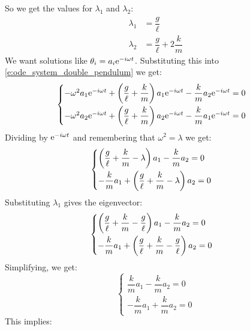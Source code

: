 So we get the values for $\lambda_1$ and $\lambda_2$:
\begin{equation}
    \begin{split}
        \lambda_1 &= \dfrac{g}{\ell}\\
        \lambda_2 &= \dfrac{g}{\ell} + 2\dfrac{k}{m}
    \end{split}
\end{equation}
We want solutions like $\theta_i = a_i\mathrm{e}^{-i\omega t}$. Substituting this into \eqref{e:ode_system_double_pendulum} we get:
\begin{equation}
    \begin{cases}
        -\omega^2 a_1 \mathrm{e}^{-i\omega t} + \left(\dfrac{g}{\ell} + \dfrac{k}{m}\right) a_1 \mathrm{e}^{-i\omega t} - \dfrac{k}{m} a_2 \mathrm{e}^{-i\omega t} = 0\\[8pt]
        -\omega^2 a_2 \mathrm{e}^{-i\omega t} + \left(\dfrac{g}{\ell} + \dfrac{k}{m}\right) a_2 \mathrm{e}^{-i\omega t} - \dfrac{k}{m} a_1 \mathrm{e}^{-i\omega t} = 0
    \end{cases}
\end{equation}
Dividing by $\mathrm{e}^{-i\omega t}$ and remembering that $\omega^2 = \lambda$ we get:
\begin{equation}
    \begin{cases}
        \left(\dfrac{g}{\ell} + \dfrac{k}{m} - \lambda\right) a_1 - \dfrac{k}{m} a_2 = 0\\[8pt]
        -\dfrac{k}{m} a_1 + \left(\dfrac{g}{\ell} + \dfrac{k}{m} - \lambda\right) a_2 = 0
    \end{cases}
\end{equation}
Substituting $\lambda_1$ gives the eigenvector:
\begin{equation}
    \begin{cases}
        \left(\dfrac{g}{\ell} + \dfrac{k}{m} - \dfrac{g}{\ell}\right) a_1 - \dfrac{k}{m} a_2 = 0\\[8pt]
        -\dfrac{k}{m} a_1 + \left(\dfrac{g}{\ell} + \dfrac{k}{m} - \dfrac{g}{\ell}\right) a_2 = 0
    \end{cases}
\end{equation}
Simplifying, we get:
\begin{equation}
    \begin{cases}
        \dfrac{k}{m} a_1 - \dfrac{k}{m} a_2 = 0\\[8pt]
        -\dfrac{k}{m} a_1 + \dfrac{k}{m} a_2 = 0
    \end{cases}
\end{equation}
This implies:
